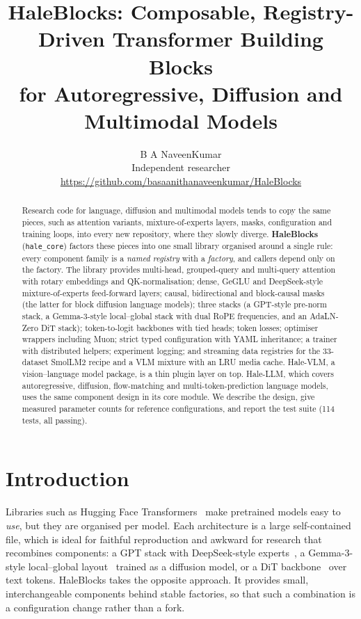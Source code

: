 \documentclass[11pt]{article}
\title{\textbf{HaleBlocks: Composable, Registry-Driven Transformer Building Blocks\\for Autoregressive, Diffusion and Multimodal Models}}
\author{B A NaveenKumar\\
\small Independent researcher\\
\small \url{https://github.com/basaanithanaveenkumar/HaleBlocks}}
\date{}
\begin{document}
\maketitle

\begin{abstract}
Research code for language, diffusion and multimodal models tends to copy the same pieces,
such as attention variants, mixture-of-experts layers, masks, configuration and training
loops, into every new repository, where they slowly diverge. \textbf{HaleBlocks}
(\texttt{hale\_core}) factors these pieces into one small library organised around a single
rule: every component family is a \emph{named registry} with a \emph{factory}, and callers
depend only on the factory. The library provides multi-head, grouped-query and multi-query
attention with rotary embeddings and QK-normalisation; dense, GeGLU and DeepSeek-style
mixture-of-experts feed-forward layers; causal, bidirectional and block-causal masks (the
latter for block diffusion language models); three stacks (a GPT-style pre-norm stack, a
Gemma-3-style local--global stack with dual RoPE frequencies, and an AdaLN-Zero DiT
stack); token-to-logit backbones with tied heads; token losses; optimiser wrappers
including Muon; strict typed configuration with YAML inheritance; a trainer with
distributed helpers; experiment logging; and streaming data registries for the 33-dataset
SmolLM2 recipe and a VLM mixture with an LRU media cache. Hale-VLM, a vision--language model package, is a thin plugin layer on top. Hale-LLM,
which covers autoregressive, diffusion, flow-matching and multi-token-prediction language
models, uses the same component design in its core module. We describe the
design, give measured parameter counts for reference configurations, and report the test
suite (114 tests, all passing).
\end{abstract}

\section{Introduction}

Libraries such as Hugging Face Transformers~\cite{wolf2020transformers} make pretrained
models easy to \emph{use}, but they are organised per model. Each architecture is a large
self-contained file, which is ideal for faithful reproduction and awkward for research that
recombines components: a GPT stack with DeepSeek-style experts~\cite{dai2024deepseekmoe}, a
Gemma-3-style local--global layout~\cite{gemma3} trained as a diffusion model, or a DiT
backbone~\cite{peebles2023dit} over text tokens. HaleBlocks takes the opposite approach.
It provides small, interchangeable components behind stable factories, so that such a
combination is a configuration change rather than a fork.
\end{document}
